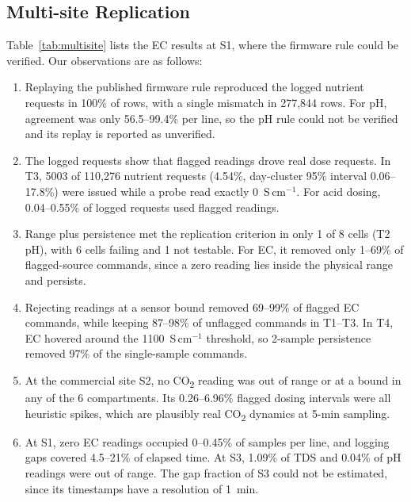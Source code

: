 \documentclass[preprint,12pt,doubleblind]{elsarticle}
\newcommand{\COtwo}{CO\textsubscript{2}}
\begin{document}
\subsection{Multi-site Replication}
Table~\ref{tab:multisite} lists the EC results at S1, where the firmware rule could be verified. Our observations are as follows:
\begin{enumerate}
\item Replaying the published firmware rule reproduced the logged nutrient requests in 100\% of rows, with a single mismatch in 277,844 rows. For pH, agreement was only 56.5--99.4\% per line, so the pH rule could not be verified and its replay is reported as unverified.
\item The logged requests show that flagged readings drove real dose requests. In T3, 5003 of 110,276 nutrient requests (4.54\%, day-cluster 95\% interval 0.06--17.8\%) were issued while a probe read exactly 0~\textmu S\,cm$^{-1}$. For acid dosing, 0.04--0.55\% of logged requests used flagged readings.
\item Range plus persistence met the replication criterion in only 1 of 8 cells (T2 pH), with 6 cells failing and 1 not testable. For EC, it removed only 1--69\% of flagged-source commands, since a zero reading lies inside the physical range and persists.
\item Rejecting readings at a sensor bound removed 69--99\% of flagged EC commands, while keeping 87--98\% of unflagged commands in T1--T3. In T4, EC hovered around the 1100~\textmu S\,cm$^{-1}$ threshold, so 2-sample persistence removed 97\% of the single-sample commands.
\item At the commercial site S2, no \COtwo{} reading was out of range or at a bound in any of the 6 compartments. Its 0.26--6.96\% flagged dosing intervals were all heuristic spikes, which are plausibly real \COtwo{} dynamics at 5-min sampling.
\item At S1, zero EC readings occupied 0--0.45\% of samples per line, and logging gaps covered 4.5--21\% of elapsed time. At S3, 1.09\% of TDS and 0.04\% of pH readings were out of range. The gap fraction of S3 could not be estimated, since its timestamps have a resolution of 1~min.
\end{enumerate}
\end{document}
